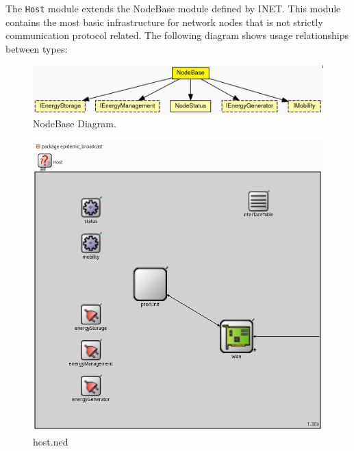 The \texttt{Host} module extends the NodeBase module defined by INET. This
module contains the most basic infrastructure for network nodes that is not
strictly communication protocol related. The following diagram shows usage
relationships between types:
\begin{figure}[H]
    \begin{center}
        \includegraphics[scale=0.26]{img/nodebase.png}
        \caption{NodeBase Diagram.}
        \label{fig:single_queue}
    \end{center}
    \vspace*{-0.8cm}
\end{figure}
\begin{figure}[H]
    \begin{center}
        \includegraphics[scale=0.35]{img/host.png}
        \caption{host.ned}
        \label{fig:single_queue}
    \end{center}
    \vspace*{-0.8cm}
\end{figure}
